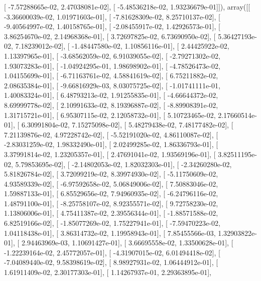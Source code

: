 \documentclass{article}
\begin{document}
       [ -7.57288665e-02,   2.47038081e-02],
       [ -5.48536218e-02,   1.93236679e-01]]), array([[ -3.36600039e-02,   1.01971603e-01],
       [ -7.81628309e-02,   8.25710137e-02],
       [ -9.40564997e-02,   1.40158765e-01],
       [ -2.08455917e-02,   1.42926573e-01],
       [  3.86254670e-02,   2.14968368e-01],
       [  3.72697825e-02,   6.73690950e-02],
       [  5.36427193e-02,   7.18239012e-02],
       [ -1.48447580e-02,   1.10856116e-01],
       [  2.44425922e-02,   1.13397965e-01],
       [ -3.68562059e-02,   6.91039055e-02],
       [ -2.79271302e-02,   1.93073283e-01],
       [ -1.04924295e-01,   1.98698902e-01],
       [ -4.78526473e-02,   1.04155699e-01],
       [ -6.71163761e-02,   4.58841619e-02],
       [  6.75211882e-02,   2.08635384e-01],
       [ -9.66816929e-03,   8.03075725e-02],
       [ -1.01741111e-01,   1.40083324e-01],
       [  6.48793213e-02,   1.91255835e-01],
       [ -4.66644372e-02,   8.69999778e-02],
       [  2.10991633e-02,   8.19396887e-02],
       [ -8.89908391e-02,   1.31715721e-01],
       [  6.95307115e-02,   2.12058732e-01],
       [  5.10723465e-02,   2.17660514e-01],
       [  6.30991804e-02,   7.15275098e-02],
       [  5.48279438e-02,   7.48177482e-02],
       [  7.21139876e-02,   4.97228742e-02],
       [ -5.52191020e-02,   4.86110087e-02],
       [ -2.83031259e-02,   1.98332490e-01],
       [  2.02499285e-02,   1.86336793e-01],
       [  3.37991814e-02,   1.23205357e-01],
       [  2.47691041e-02,   1.93569196e-01],
       [  3.82511195e-02,   5.79853695e-02],
       [ -2.14802053e-02,   1.82032303e-01],
       [ -2.34260280e-02,   5.81826784e-02],
       [  3.72099219e-02,   8.39974930e-02],
       [ -5.11750609e-02,   4.93589339e-02],
       [ -6.97592658e-02,   5.06849006e-02],
       [  7.50883046e-02,   1.59887133e-01],
       [  6.85529656e-02,   7.94960935e-02],
       [ -6.24796116e-02,   1.48791100e-01],
       [ -8.25758107e-02,   8.92355571e-02],
       [  9.72758230e-02,   1.13806006e-01],
       [  4.75411387e-02,   2.39556344e-01],
       [ -1.88571588e-02,   6.82519166e-02],
       [ -1.85077269e-02,   1.75227941e-01],
       [ -7.59470223e-02,   1.04118438e-01],
       [  3.86314732e-02,   1.19958943e-01],
       [  7.85455566e-03,   1.32903822e-01],
       [  2.94463969e-03,   1.10691427e-01],
       [  3.66695558e-02,   1.33500628e-01],
       [ -1.22239164e-02,   2.45772057e-01],
       [ -4.31907015e-02,   6.01494418e-02],
       [ -7.04089440e-02,   9.58398619e-02],
       [  8.98927931e-02,   1.06444912e-01],
       [  1.61911409e-02,   2.30177303e-01],
       [  1.14267937e-01,   2.29363895e-01],
\end{document}
